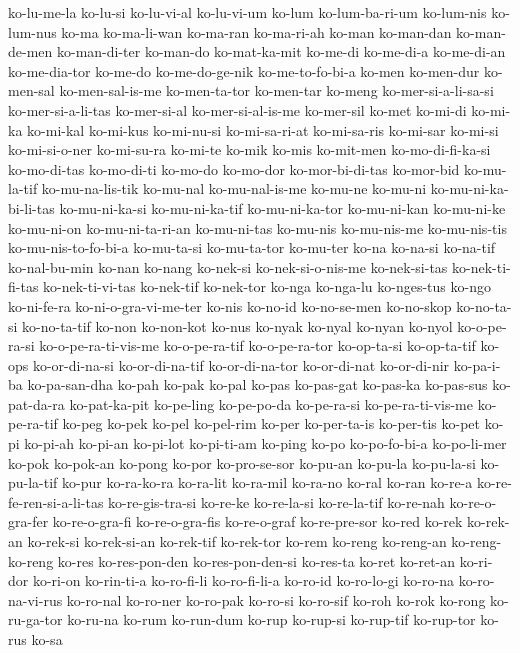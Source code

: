 {ko-lu-me-la ko-lu-si ko-lu-vi-al ko-lu-vi-um ko-lum ko-lum-ba-ri-um
ko-lum-nis ko-lum-nus ko-ma ko-ma-li-wan ko-ma-ran ko-ma-ri-ah ko-man
ko-man-dan ko-man-de-men ko-man-di-ter ko-man-do ko-mat-ka-mit ko-me-di
ko-me-di-a ko-me-di-an ko-me-dia-tor ko-me-do ko-me-do-ge-nik
ko-me-to-fo-bi-a ko-men ko-men-dur ko-men-sal ko-men-sal-is-me
ko-men-ta-tor ko-men-tar ko-meng ko-mer-si-a-li-sa-si ko-mer-si-a-li-tas
ko-mer-si-al ko-mer-si-al-is-me ko-mer-sil ko-met ko-mi-di ko-mi-ka
ko-mi-kal ko-mi-kus ko-mi-nu-si ko-mi-sa-ri-at ko-mi-sa-ris ko-mi-sar
ko-mi-si ko-mi-si-o-ner ko-mi-su-ra ko-mi-te ko-mik ko-mis ko-mit-men
ko-mo-di-fi-ka-si ko-mo-di-tas ko-mo-di-ti ko-mo-do ko-mo-dor
ko-mor-bi-di-tas ko-mor-bid ko-mu-la-tif ko-mu-na-lis-tik ko-mu-nal
ko-mu-nal-is-me ko-mu-ne ko-mu-ni ko-mu-ni-ka-bi-li-tas ko-mu-ni-ka-si
ko-mu-ni-ka-tif ko-mu-ni-ka-tor ko-mu-ni-kan ko-mu-ni-ke ko-mu-ni-on
ko-mu-ni-ta-ri-an ko-mu-ni-tas ko-mu-nis ko-mu-nis-me ko-mu-nis-tis
ko-mu-nis-to-fo-bi-a ko-mu-ta-si ko-mu-ta-tor ko-mu-ter ko-na ko-na-si
ko-na-tif ko-nal-bu-min ko-nan ko-nang ko-nek-si ko-nek-si-o-nis-me
ko-nek-si-tas ko-nek-ti-fi-tas ko-nek-ti-vi-tas ko-nek-tif ko-nek-tor
ko-nga ko-nga-lu ko-nges-tus ko-ngo ko-ni-fe-ra ko-ni-o-gra-vi-me-ter
ko-nis ko-no-id ko-no-se-men ko-no-skop ko-no-ta-si ko-no-ta-tif ko-non
ko-non-kot ko-nus ko-nyak ko-nyal ko-nyan ko-nyol ko-o-pe-ra-si
ko-o-pe-ra-ti-vis-me ko-o-pe-ra-tif ko-o-pe-ra-tor ko-op-ta-si
ko-op-ta-tif ko-ops ko-or-di-na-si ko-or-di-na-tif ko-or-di-na-tor
ko-or-di-nat ko-or-di-nir ko-pa-i-ba ko-pa-san-dha ko-pah ko-pak ko-pal
ko-pas ko-pas-gat ko-pas-ka ko-pas-sus ko-pat-da-ra ko-pat-ka-pit
ko-pe-ling ko-pe-po-da ko-pe-ra-si ko-pe-ra-ti-vis-me ko-pe-ra-tif ko-peg
ko-pek ko-pel ko-pel-rim ko-per ko-per-ta-is ko-per-tis ko-pet ko-pi
ko-pi-ah ko-pi-an ko-pi-lot ko-pi-ti-am ko-ping ko-po ko-po-fo-bi-a
ko-po-li-mer ko-pok ko-pok-an ko-pong ko-por ko-pro-se-sor ko-pu-an
ko-pu-la ko-pu-la-si ko-pu-la-tif ko-pur ko-ra-ko-ra ko-ra-lit ko-ra-mil
ko-ra-no ko-ral ko-ran ko-re-a ko-re-fe-ren-si-a-li-tas ko-re-gis-tra-si
ko-re-ke ko-re-la-si ko-re-la-tif ko-re-nah ko-re-o-gra-fer ko-re-o-gra-fi
ko-re-o-gra-fis ko-re-o-graf ko-re-pre-sor ko-red ko-rek ko-rek-an
ko-rek-si ko-rek-si-an ko-rek-tif ko-rek-tor ko-rem ko-reng ko-reng-an
ko-reng-ko-reng ko-res ko-res-pon-den ko-res-pon-den-si ko-res-ta ko-ret
ko-ret-an ko-ri-dor ko-ri-on ko-rin-ti-a ko-ro-fi-li ko-ro-fi-li-a
ko-ro-id ko-ro-lo-gi ko-ro-na ko-ro-na-vi-rus ko-ro-nal ko-ro-ner
ko-ro-pak ko-ro-si ko-ro-sif ko-roh ko-rok ko-rong ko-ru-ga-tor ko-ru-na
ko-rum ko-run-dum ko-rup ko-rup-si ko-rup-tif ko-rup-tor ko-rus ko-sa
}
